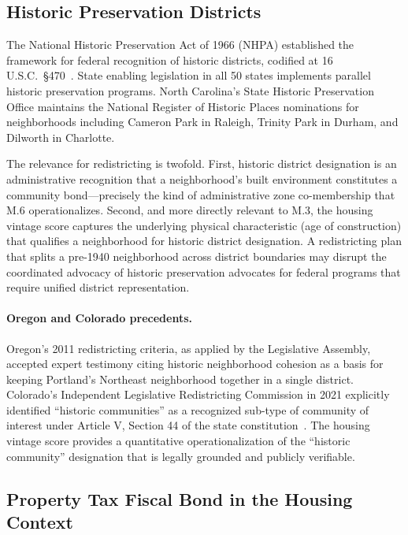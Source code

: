 \subsection{Historic Preservation Districts}

The National Historic Preservation Act of 1966 (NHPA) established the
framework for federal recognition of historic districts, codified at 16 U.S.C.\
\S 470~\citep{nhpa1966}.
State enabling legislation in all 50 states implements parallel historic
preservation programs.
North Carolina's State Historic Preservation Office maintains the National
Register of Historic Places nominations for neighborhoods including Cameron Park
in Raleigh, Trinity Park in Durham, and Dilworth in Charlotte.

The relevance for redistricting is twofold.
First, historic district designation is an administrative recognition that
a neighborhood's built environment constitutes a community bond---precisely
the kind of administrative zone co-membership that M.6 operationalizes.
Second, and more directly relevant to M.3, the housing vintage score captures
the underlying physical characteristic (age of construction) that qualifies
a neighborhood for historic district designation.
A redistricting plan that splits a pre-1940 neighborhood across district
boundaries may disrupt the coordinated advocacy of historic preservation
advocates for federal programs that require unified district representation.

\paragraph{Oregon and Colorado precedents.}
Oregon's 2011 redistricting criteria, as applied by the Legislative Assembly,
accepted expert testimony citing historic neighborhood cohesion as a basis
for keeping Portland's Northeast neighborhood together in a single district.
Colorado's Independent Legislative Redistricting Commission in 2021 explicitly
identified ``historic communities'' as a recognized sub-type of community of
interest under Article V, Section 44 of the state constitution~\citep{coart5s44}.
The housing vintage score provides a quantitative operationalization of the
``historic community'' designation that is legally grounded and publicly verifiable.

\subsection{Property Tax Fiscal Bond in the Housing Context}

